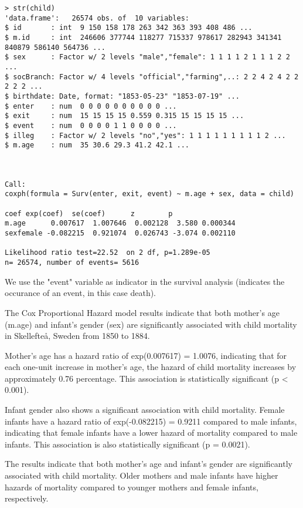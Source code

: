 \documentclass[12pt,letterpaper]{article}
\begin{document}
\newpage	
\begin{verbatim}
> str(child)
'data.frame':	26574 obs. of  10 variables:
$ id       : int  9 150 158 178 263 342 363 393 408 486 ...
$ m.id     : int  246606 377744 118277 715337 978617 282943 341341 840879 586140 564736 ...
$ sex      : Factor w/ 2 levels "male","female": 1 1 1 1 2 1 1 1 2 2 ...
$ socBranch: Factor w/ 4 levels "official","farming",..: 2 2 4 2 4 2 2 2 2 2 ...
$ birthdate: Date, format: "1853-05-23" "1853-07-19" ...
$ enter    : num  0 0 0 0 0 0 0 0 0 0 ...
$ exit     : num  15 15 15 15 0.559 0.315 15 15 15 15 ...
$ event    : num  0 0 0 0 1 1 0 0 0 0 ...
$ illeg    : Factor w/ 2 levels "no","yes": 1 1 1 1 1 1 1 1 1 2 ...
$ m.age    : num  35 30.6 29.3 41.2 42.1 ...



Call:
coxph(formula = Surv(enter, exit, event) ~ m.age + sex, data = child)

coef exp(coef)  se(coef)      z        p
m.age      0.007617  1.007646  0.002128  3.580 0.000344
sexfemale -0.082215  0.921074  0.026743 -3.074 0.002110

Likelihood ratio test=22.52  on 2 df, p=1.289e-05
n= 26574, number of events= 5616 

\end{verbatim}	

We use the "event" variable as indicator in the survival analysis (indicates the occurance of an event, in this case death).


The Cox Proportional Hazard model results indicate that both mother's age (m.age) and infant's gender (sex) are significantly associated with child mortality in Skellefteå, Sweden from 1850 to 1884.

Mother's age has a hazard ratio of exp(0.007617) = 1.0076, indicating that for each one-unit increase in mother's age, the hazard of child mortality increases by approximately 0.76 percentage. This association is statistically significant (p < 0.001).

Infant gender also shows a significant association with child mortality. Female infants have a hazard ratio of exp(-0.082215) = 0.9211 compared to male infants, indicating that female infants have a lower hazard of mortality compared to male infants. This association is also statistically significant (p = 0.0021).

The results indicate that both mother's age and infant's gender are significantly associated with child mortality. Older mothers and male infants have higher hazards of mortality compared to younger mothers and female infants, respectively.
\end{document}
